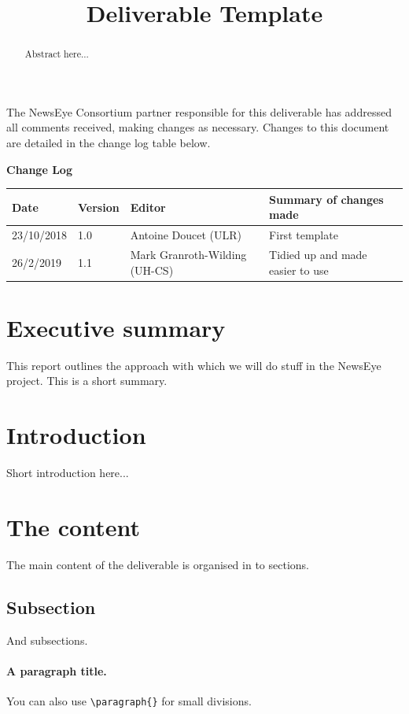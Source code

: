 \documentclass{newseye_del}
\title{Deliverable Template}
\begin{document}
\titlepage

The NewsEye Consortium partner responsible for this deliverable has
addressed all comments received, making changes as necessary.
Changes to this document are detailed in the change log table below.

\vspace{10pt}
\textbf{Change Log}

\noindent
\begin{tabular}{ |p{2.5cm}|p{1.3cm}|p{4.2cm}|p{6.5cm}|  }
 \hline
 \rowcolor{lightgray} Date & Version & Editor & Summary of changes made\\
 \hline
  23/10/2018   & 1.0    & Antoine Doucet (ULR) & First template \\
 \hline
 	26/2/2019    & 1.1    & Mark Granroth-Wilding (UH-CS) & Tidied up and made easier to use \\
  \hline
\end{tabular}




\newpage
\section*{Executive summary}

This report outlines the approach with which we will do stuff in the NewsEye
project. This is a short summary.

\newpage
\tableofcontents
\newpage


\section{Introduction}
\begin{abstract}
  Abstract here...
\end{abstract}

Short introduction here...


\section{The content}
The main content of the deliverable is organised in to sections.

\subsection{Subsection}
\label{sec:example subsection}

And subsections.

\paragraph{A paragraph title.}
You can also use \verb.\paragraph{}. for small divisions.
\end{document}
